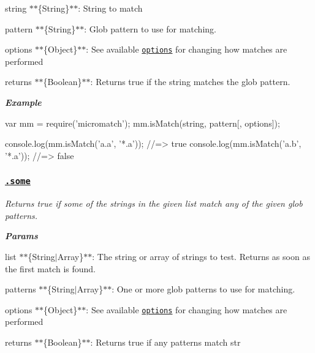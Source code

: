 {\itshape 
\begin{DoxyItemize}
\item {\ttfamily string} $\ast$$\ast$\{String\}$\ast$$\ast$\+: String to match
\item {\ttfamily pattern} $\ast$$\ast$\{String\}$\ast$$\ast$\+: Glob pattern to use for matching.
\item {\ttfamily options} $\ast$$\ast$\{Object\}$\ast$$\ast$\+: See available \href{#options}{\tt options} for changing how matches are performed
\item {\ttfamily returns} $\ast$$\ast$\{Boolean\}$\ast$$\ast$\+: Returns true if the string matches the glob pattern.
\end{DoxyItemize}}

{\itshape {\bfseries Example}}

{\itshape 
\begin{DoxyCode}
var mm = require('micromatch');
mm.isMatch(string, pattern[, options]);

console.log(mm.isMatch('a.a', '*.a'));
//=> true
console.log(mm.isMatch('a.b', '*.a'));
//=> false
\end{DoxyCode}
}

{\itshape \subsubsection*{\href{index.js#L192}{\tt .some}}}

{\itshape }

{\itshape Returns true if some of the strings in the given {\ttfamily list} match any of the given glob {\ttfamily patterns}.}

{\itshape {\bfseries Params}}

{\itshape 
\begin{DoxyItemize}
\item {\ttfamily list} $\ast$$\ast$\{String$\vert$\+Array\}$\ast$$\ast$\+: The string or array of strings to test. Returns as soon as the first match is found.
\item {\ttfamily patterns} $\ast$$\ast$\{String$\vert$\+Array\}$\ast$$\ast$\+: One or more glob patterns to use for matching.
\item {\ttfamily options} $\ast$$\ast$\{Object\}$\ast$$\ast$\+: See available \href{#options}{\tt options} for changing how matches are performed
\item {\ttfamily returns} $\ast$$\ast$\{Boolean\}$\ast$$\ast$\+: Returns true if any patterns match {\ttfamily str}
\end{DoxyItemize}}

